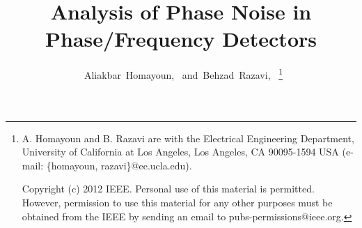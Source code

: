 

\def\beq{\begin{equation}}		%
\def\eeq{\end{equation}}
\def\ber{\begin{eqnarray}}		%
\def\eer{\end{eqnarray}}
\def\bd{\begin{displaymath}}		%
\def\ed{\end{displaymath}}
\def\bfig{\begin{figure}}		%
\def\efig{\end{figure}}
\def\btab{\begin{table}}		%
\def\etab{\end{table}}
\def\IntAll{\int_{-\infty}^{\infty}}
\def\SumAll#1{\sum_{#1 = -\infty}^{\infty} \!}
\def\Expect#1{{\cal E} \! \left\{ #1 \right\}}
\def\sdm{$\Sigma\Delta$~modulator}
\def\comment#1{}                        %



\documentclass[journal]{IEEEtran}
\usepackage{setspace}
\usepackage{color}
\usepackage{graphicx}

\ifCLASSINFOpdf

\else

\fi





\title{Analysis of Phase Noise in Phase/Frequency Detectors}
%

\author{~Aliakbar~Homayoun,~
        and~Behzad~Razavi,~%
\thanks{A. Homayoun and B. Razavi are with the Electrical Engineering Department, University of California
at Los Angeles, Los Angeles, CA 90095-1594 USA (e-mail: \{homayoun, razavi\}@ee.ucla.edu).

Copyright (c) 2012 IEEE. Personal use of this material is
permitted. However, permission to use this material
for any other purposes must be obtained from the IEEE by
sending an email to pubs-permissions@ieee.org.
}
}

